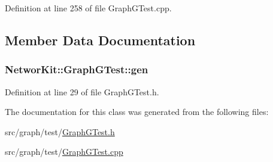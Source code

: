 Definition at line 258 of file Graph\-G\-Test.\-cpp.



\subsection{Member Data Documentation}
\hypertarget{class_networ_kit_1_1_graph_g_test_ae04f864deaaf9ef28e20a883d5a0e7db}{
\subsubsection[{gen}]{ Networ\-Kit\-::\-Graph\-G\-Test\-::gen\hspace{0.3cm}{\ttfamily [protected]}}}\label{class_networ_kit_1_1_graph_g_test_ae04f864deaaf9ef28e20a883d5a0e7db}


Definition at line 29 of file Graph\-G\-Test.\-h.



The documentation for this class was generated from the following files\-:\begin{DoxyCompactItemize}
\item 
src/graph/test/\hyperlink{_graph_g_test_8h}{Graph\-G\-Test.\-h}\item 
src/graph/test/\hyperlink{_graph_g_test_8cpp}{Graph\-G\-Test.\-cpp}\end{DoxyCompactItemize}
